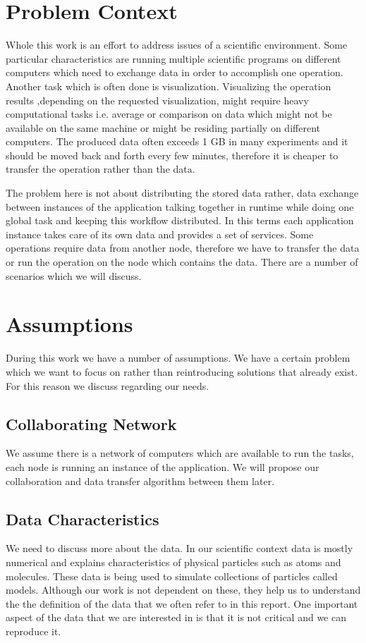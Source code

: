 \section{Problem Context}
Whole this work is an effort to address issues of a scientific environment. Some particular characteristics
are running multiple scientific programs on different computers which need to exchange data in order to
accomplish one operation. Another task which is often done is visualization. Visualizing the operation results
,depending on the requested visualization, might require heavy computational tasks i.e. average or comparison
on data which might not be available on the same machine or might be residing partially on different computers.
The produced data often exceeds 1 GB in many experiments and it should be moved back and forth every few minutes,
therefore it is cheaper to transfer the operation rather than the data.

The problem here is not about distributing the stored data rather, data exchange between instances of the application 
talking together in runtime while doing one global task and keeping this workflow distributed. In this terms each
application instance takes care of its own data and provides a set of services. Some operations require data from
another node, therefore we have to transfer the data or run the operation on the node which contains the data. There
are a number of scenarios which we will discuss.

\section{Assumptions}
During this work we have a number of assumptions. We have a certain problem which we want to focus
on rather than reintroducing solutions that already exist. For this reason we discuss regarding our 
needs.

\subsection{Collaborating Network}
We assume there is a network of computers which are available to run the tasks, each node is running an instance
of the application. We will propose our collaboration and data transfer algorithm between them later.

\subsection{Data Characteristics}
We need to discuss more about the data. In our scientific context data is mostly numerical and explains characteristics
of physical particles such as atoms and molecules. These data is being used to simulate collections of particles called
models. Although our work is not dependent on these, they help us to understand the the definition of the data that
we often refer to in this report. One important aspect of the data that we are interested in is that it is not critical 
and we can reproduce it. 

